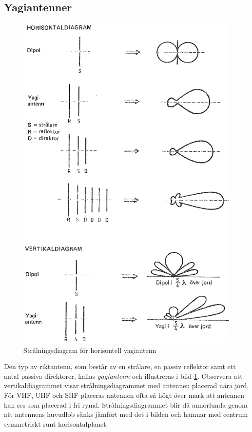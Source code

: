 \subsection{Yagiantenner}

\begin{figure}
  \includegraphics[width=\textwidth]{images/cropped_pdfs/bild_2_6-20.pdf}
  \caption{Strålningsdiagram för horisontell yagiantenn}
  \label{fig:bildII6-20}
\end{figure}

Den typ av riktantenn, som består av en strålare, en passiv reflektor
samt ett antal passiva direktorer, kallas \emph{yagiantenn} och illustreras i
bild \ref{fig:bildII6-20}.
Observera att vertikaldiagrammet visar strålningsdiagrammet med antennen
placerad nära jord.
För VHF, UHF och SHF placeras antennen ofta så högt över mark att antennen kan ses
som placerad i fri rymd.
Strålningsdiagrammet blir då annorlunda genom att antennens huvudlob sänks jämfört
med det i bilden och hamnar med centrum symmetriskt runt horisontalplanet.

